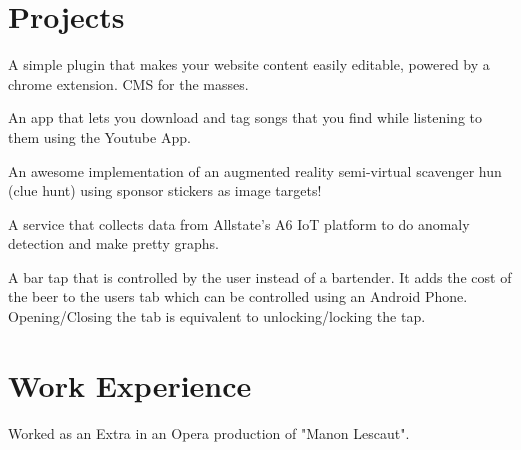 \documentclass[]{deedy-resume-openfont}
\begin{document}
\begin{minipage}[t]{0.66\textwidth} 


\section{Projects}
A simple plugin that makes your website content easily editable, powered by a chrome extension. CMS for the masses.
\sectionsep

An app that lets you download and tag songs that you find while listening to them using the Youtube App.
\sectionsep

An awesome implementation of an augmented reality semi-virtual scavenger hun (clue hunt) using sponsor stickers as image targets!
\sectionsep

A service that collects data from Allstate's A6 IoT platform to do anomaly detection and make pretty graphs.
\sectionsep

A bar tap that is controlled by the user instead of a bartender. It adds the cost of the beer to the users tab which can be controlled using an Android Phone. Opening/Closing the tab is equivalent to unlocking/locking the tap.
\sectionsep


\section{Work Experience} 
Worked as an Extra in an Opera production of "Manon Lescaut".


\end{minipage}
\end{document}
